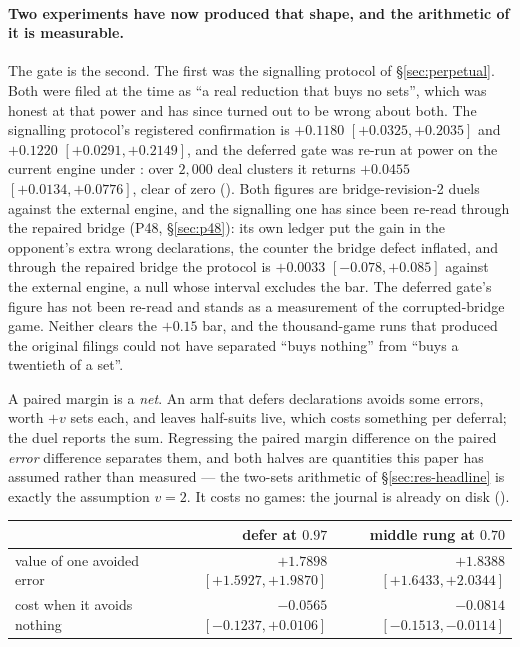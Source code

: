 \documentclass[11pt,letterpaper]{article}
\begin{document}
\paragraph{Two experiments have now produced that shape, and the arithmetic of
it is measurable.} The gate is the second. The first was the signalling
protocol of \S\ref{sec:perpetual}. Both were filed at the time as ``a real
reduction that buys no sets'', which was honest at that power and has since
turned out to be wrong about both. The signalling protocol's registered
confirmation is $+0.1180$ $[+0.0325, +0.2035]$ and $+0.1220$ $[+0.0291,
+0.2149]$, and the deferred gate was re-run at power on the current engine
under : over $2{,}000$ deal clusters it
returns $+0.0455$ $[+0.0134, +0.0776]$, clear of zero
(). Both figures are bridge-revision-2
duels against the external engine, and the signalling one has since been
re-read through the repaired bridge (P48, \S\ref{sec:p48}): its own ledger
put the gain in the opponent's extra wrong declarations, the counter the
bridge defect inflated, and through the repaired bridge the protocol is
$+0.0033$ $[-0.078, +0.085]$ against the external engine, a null whose interval excludes
the bar. The deferred gate's figure has not been re-read and stands as a
measurement of the corrupted-bridge game. Neither clears the $+0.15$ bar,
and the thousand-game runs that produced the original filings could not have
separated ``buys nothing'' from
``buys a twentieth of a set''.

A paired margin is a \emph{net}. An arm that defers declarations avoids some
errors, worth $+v$ sets each, and leaves half-suits live, which costs
something per deferral; the duel reports the sum. Regressing the paired margin
difference on the paired \emph{error} difference separates them, and both
halves are quantities this paper has assumed rather than measured --- the
two-sets arithmetic of \S\ref{sec:res-headline} is exactly the assumption $v =
2$. It costs no games: the journal is already on disk
().

\begin{center}
\small
\begin{tabular}{lrr}
\toprule
& defer at $0.97$ & middle rung at $0.70$ \\
\midrule
value of one avoided error & $+1.7898$ $[+1.5927, +1.9870]$ & $+1.8388$ $[+1.6433, +2.0344]$ \\
cost when it avoids nothing & $-0.0565$ $[-0.1237, +0.0106]$ & $-0.0814$ $[-0.1513, -0.0114]$ \\
\bottomrule
\end{tabular}
\end{center}
\end{document}
